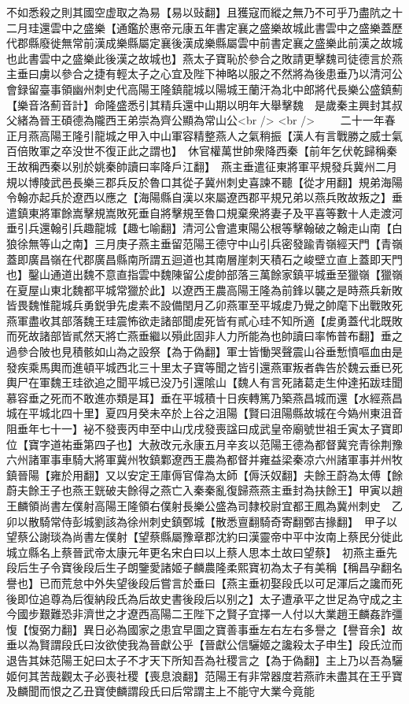 不如悉殺之則其國空虚取之為易【易以䜴翻】且獲寇而縱之無乃不可乎乃盡阬之十二月珪還雲中之盛樂【通鑑於惠帝元康五年書定襄之盛樂故城此書雲中之盛樂蓋歷代郡縣廢徙無常前漢成樂縣屬定襄後漢成樂縣屬雲中前書定襄之盛樂此前漢之故城也此書雲中之盛樂此後漢之故城也】燕太子寶恥於參合之敗請更擊魏司徒德言於燕主垂曰虜以參合之捷有輕太子之心宜及陛下神略以服之不然將為後患垂乃以清河公會録留臺事領幽州刺史代高陽王隆鎮龍城以陽城王蘭汗為北中郎將代長樂公盛鎮薊【樂音洛薊音計】命隆盛悉引其精兵還中山期以明年大舉擊魏　是歲秦主興封其叔父緒為晉王碩德為隴西王弟崇為齊公顯為常山公<br />
<br />
　　二十一年春正月燕高陽王隆引龍城之甲入中山軍容精整燕人之氣稍振【漢人有言戰勝之威士氣百倍敗軍之卒没世不復正此之謂也】　休官權萬世帥衆降西秦【前年乞伏乾歸稱秦王故稱西秦以别於姚秦帥讀曰率降戶江翻】　燕主垂遣征東將軍平規發兵冀州二月規以博陵武邑長樂三郡兵反於魯口其從子冀州刺史喜諫不聽【從才用翻】規弟海陽令翰亦起兵於遼西以應之【海陽縣自漢以來屬遼西郡平規兄弟以燕兵敗故叛之】垂遣鎮東將軍餘嵩擊規嵩敗死垂自將擊規至魯口規棄衆將妻子及平喜等數十人走渡河垂引兵還翰引兵趣龍城【趣七喻翻】清河公會遣東陽公根等擊翰破之翰走山南【白狼徐無等山之南】三月庚子燕主垂留范陽王德守中山引兵密發踰青嶺經天門【青嶺蓋即廣昌嶺在代郡廣昌縣南所謂五迴道也其南層崖刺天積石之峻壁立直上蓋即天門也】鑿山通道出魏不意直指雲中魏陳留公䖍帥部落三萬餘家鎮平城垂至獵嶺【獵嶺在夏屋山東北魏都平城常獵於此】以遼西王農高陽王隆為前鋒以襲之是時燕兵新敗皆畏魏惟龍城兵勇鋭爭先䖍素不設備閏月乙卯燕軍至平城䖍乃覺之帥麾下出戰敗死燕軍盡收其部落魏王珪震怖欲走諸部聞䖍死皆有貳心珪不知所適【䖍勇蓋代北既敗而死故諸部皆貳然天將亡燕垂繼以殞此固非人力所能為也帥讀曰率怖普布翻】垂之過參合陂也見積骸如山為之設祭【為于偽翻】軍士皆慟哭聲震山谷垂慙憤嘔血由是發疾乘馬輿而進頓平城西北三十里太子寶等聞之皆引還燕軍叛者犇告於魏云垂已死輿尸在軍魏王珪欲追之聞平城已没乃引還隂山【魏人有言死諸葛走生仲達拓跋珪聞慕容垂之死而不敢進亦類是耳】垂在平城積十日疾轉篤乃築燕昌城而還【水經燕昌城在平城北四十里】夏四月癸未卒於上谷之沮陽【賢曰沮陽縣故城在今媯州東沮音阻垂年七十一】袐不發喪丙申至中山戊戌發喪諡曰成武皇帝廟號世祖壬寅太子寶即位【寶字道祐垂第四子也】大赦改元永康五月辛亥以范陽王德為都督冀兖青徐荆豫六州諸軍事車騎大將軍冀州牧鎮鄴遼西王農為都督并雍益梁秦凉六州諸軍事并州牧鎮晉陽【雍於用翻】又以安定王庫傉官偉為太師【傉沃奴翻】夫餘王蔚為太傅【餘蔚夫餘王子也燕王皝破夫餘得之燕亡入秦秦亂復歸燕燕主垂封為扶餘王】甲寅以趙王麟領尚書左僕射高陽王隆領右僕射長樂公盛為司隸校尉宜都王鳳為冀州刺史　乙卯以散騎常侍彭城劉該為徐州刺史鎮鄄城【散悉亶翻騎奇寄翻鄄吉掾翻】　甲子以望蔡公謝琰為尚書左僕射【望蔡縣屬豫章郡沈約曰漢靈帝中平中汝南上蔡民分徙此城立縣名上蔡晉武帝太康元年更名宋白曰以上蔡人思本土故曰望蔡】　初燕主垂先段后生子令寶後段后生子朗鑒愛諸姬子麟農隆柔熙寶初為太子有美稱【稱昌孕翻名譽也】已而荒怠中外失望後段后嘗言於垂曰【燕主垂初娶段氏以可足渾后之讒而死後即位追尊為后復納段氏為后故史書後段后以别之】太子遭承平之世足為守成之主今國步艱難恐非濟世之才遼西高陽二王陛下之賢子宜擇一人付以大業趙王麟姦詐彊愎【愎弼力翻】異日必為國家之患宜早圖之寶善事垂左右左右多譽之【譽音余】故垂以為賢謂段氏曰汝欲使我為晉獻公乎【晉獻公信驪姬之讒殺太子申生】段氏泣而退告其妹范陽王妃曰太子不才天下所知吾為社稷言之【為于偽翻】主上乃以吾為驪姬何其苦哉觀太子必喪社稷【喪息浪翻】范陽王有非常器度若燕祚未盡其在王乎寶及麟聞而恨之乙丑寶使麟謂段氏曰后常謂主上不能守大業今竟能